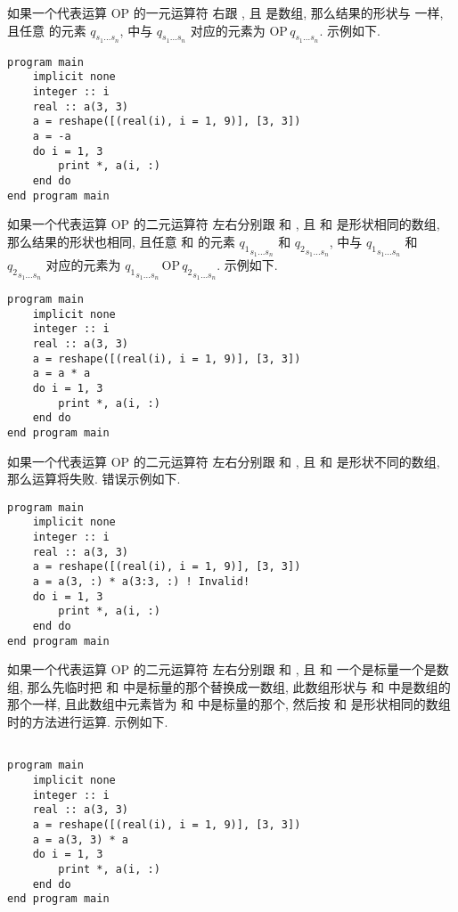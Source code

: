 如果一个代表运算 $\text{OP}$ 的一元运算符  右跟 , 且  是数组, 那么结果的形状与  一样, 且任意  的元素 $q_{s_1\dots s_n}$,  中与 $q_{s_1\dots s_n}$ 对应的元素为 $\text{OP}\,q_{s_1\dots s_n}$. 示例如下.
\begin{lstlisting}
program main
    implicit none
    integer :: i
    real :: a(3, 3)
    a = reshape([(real(i), i = 1, 9)], [3, 3])
    a = -a
    do i = 1, 3
        print *, a(i, :)
    end do
end program main
\end{lstlisting}

如果一个代表运算 $\text{OP}$ 的二元运算符  左右分别跟  和 , 且  和  是形状相同的数组, 那么结果的形状也相同, 且任意  和  的元素 ${q_1}_{s_1\dots s_n}$ 和 ${q_2}_{s_1\dots s_n}$,  中与 ${q_1}_{s_1\dots s_n}$ 和 ${q_2}_{s_1\dots s_n}$ 对应的元素为 ${q_1}_{s_1\dots s_n}\,\text{OP}\,{q_2}_{s_1\dots s_n}$. 示例如下.
\begin{lstlisting}
program main
    implicit none
    integer :: i
    real :: a(3, 3)
    a = reshape([(real(i), i = 1, 9)], [3, 3])
    a = a * a
    do i = 1, 3
        print *, a(i, :)
    end do
end program main
\end{lstlisting}
如果一个代表运算 $\text{OP}$ 的二元运算符  左右分别跟  和 , 且  和  是形状不同的数组, 那么运算将失败. 错误示例如下.
\begin{lstlisting}
program main
    implicit none
    integer :: i
    real :: a(3, 3)
    a = reshape([(real(i), i = 1, 9)], [3, 3])
    a = a(3, :) * a(3:3, :) ! Invalid!
    do i = 1, 3
        print *, a(i, :)
    end do
end program main
\end{lstlisting}
如果一个代表运算 $\text{OP}$ 的二元运算符  左右分别跟  和 , 且  和  一个是标量一个是数组, 那么先临时把  和  中是标量的那个替换成一数组, 此数组形状与  和  中是数组的那个一样, 且此数组中元素皆为  和  中是标量的那个, 然后按  和  是形状相同的数组时的方法进行运算. 示例如下.
\begin{lstlisting}

program main
    implicit none
    integer :: i
    real :: a(3, 3)
    a = reshape([(real(i), i = 1, 9)], [3, 3])
    a = a(3, 3) * a
    do i = 1, 3
        print *, a(i, :)
    end do
end program main
\end{lstlisting}

